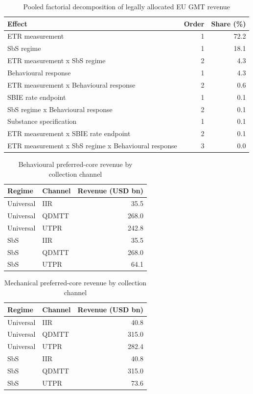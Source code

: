 \begin{table}[H]
\centering
\caption{Pooled factorial decomposition of legally allocated EU GMT revenue}
\label{tab:stage4_6_anova_pooled_generated}
\small
\begin{tabular}{@{}lrr@{}}
\toprule
Effect & Order & Share (\%) \\
\midrule
ETR measurement & 1 & 72.2 \\
SbS regime & 1 & 18.1 \\
ETR measurement x SbS regime & 2 & 4.3 \\
Behavioural response & 1 & 4.3 \\
ETR measurement x Behavioural response & 2 & 0.6 \\
SBIE rate endpoint & 1 & 0.1 \\
SbS regime x Behavioural response & 2 & 0.1 \\
Substance specification & 1 & 0.1 \\
ETR measurement x SBIE rate endpoint & 2 & 0.1 \\
ETR measurement x SbS regime x Behavioural response & 3 & 0.0 \\
\bottomrule
\end{tabular}
\end{table}

\begin{table}[H]
\centering
\caption{Behavioural preferred-core revenue by collection channel}
\label{tab:stage4_6_preferred_behavioural_channels_generated}
\small
\begin{tabular}{@{}llr@{}}
\toprule
Regime & Channel & Revenue (USD bn) \\
\midrule
Universal & IIR & 35.5 \\
Universal & QDMTT & 268.0 \\
Universal & UTPR & 242.8 \\
SbS & IIR & 35.5 \\
SbS & QDMTT & 268.0 \\
SbS & UTPR & 64.1 \\
\bottomrule
\end{tabular}
\end{table}

\begin{table}[H]
\centering
\caption{Mechanical preferred-core revenue by collection channel}
\label{tab:stage4_6_preferred_channels_generated}
\small
\begin{tabular}{@{}llr@{}}
\toprule
Regime & Channel & Revenue (USD bn) \\
\midrule
Universal & IIR & 40.8 \\
Universal & QDMTT & 315.0 \\
Universal & UTPR & 282.4 \\
SbS & IIR & 40.8 \\
SbS & QDMTT & 315.0 \\
SbS & UTPR & 73.6 \\
\bottomrule
\end{tabular}
\end{table}


